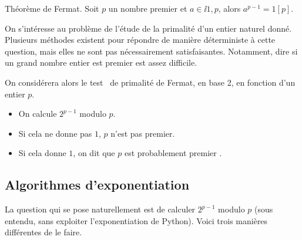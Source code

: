 \begin{theoreme}{Théorème de Fermat.}
  Soit $p$ un nombre premier et $a \in \ii{1,p}$, alors $a^{p-1} = 1 [p]$.
\end{theoreme}

On s'intéresse au problème de l'étude de la primalité d'un entier naturel donné. 
Plusieurs méthodes existent pour répondre de manière déterministe à cette question, mais elles ne sont pas nécessairement satisfaisantes. 
Notamment, dire si un grand nombre entier est premier est assez difficile. 

On considérera alors le \og test \fg\ de primalité de Fermat, en base 2, en fonction d'un entier $p$.
\begin{itemize}
  \item On calcule $2^{p-1}$ modulo $p$. 
  \item Si cela ne donne pas $1$, $p$ n'est pas premier. 
  \item Si cela donne $1$, on dit que \og $p$ est probablement premier \fg.
\end{itemize}

\subsection{Algorithmes d'exponentiation}

La question qui se pose naturellement est de calculer $2^{p-1}$ modulo $p$ (sous entendu, sans exploiter l'exponentiation de Python). Voici trois manières différentes de le faire. 

